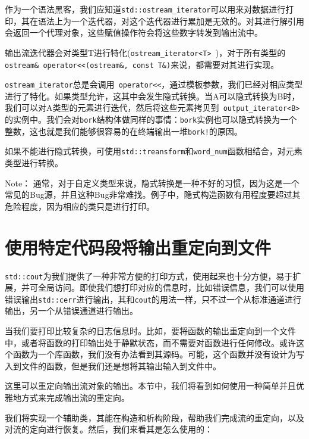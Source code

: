 
作为一个语法黑客，我们应知道\texttt{std::ostream\_iterator}可以用来对数据进行打印，其在语法上为一个迭代器，对这个迭代器进行累加是无效的。对其进行解引用会返回一个代理对象，这些赋值操作符会将这些数字转发到输出流中。

输出流迭代器会对类型T进行特化(\texttt{ostream\_iterator<T> })，对于所有类型的\texttt{ ostream\& operator<<(ostream\&, const T\&)}来说，都需要对其进行实现。

\texttt{ostream\_iterator}总是会调用\texttt{ operator<<}，通过模板参数，我们已经对相应类型进行了特化。如果类型允许，这其中会发生隐式转换。当A可以隐式转换为B时，我们可以对A类型的元素进行迭代，然后将这些元素拷贝到\texttt{ output\_iterator<B>}的实例中。我们会对\texttt{bork}结构体做同样的事情：\texttt{bork}实例也可以隐式转换为一个整数，这也就是我们能够很容易的在终端输出一堆\texttt{bork!}的原因。

如果不能进行隐式转换，可使用\texttt{std::treansform}和\texttt{word\_num}函数相结合，对元素类型进行转换。

\begin{myInfoBox}
Note： 通常，对于自定义类型来说，隐式转换是一种不好的习惯，因为这是一个常见的Bug源，并且这种Bug非常难找。例子中，隐式构造函数有用程度要超过其危险程度，因为相应的类只是进行打印。
\end{myInfoBox}


\section{使用特定代码段将输出重定向到文件}

\texttt{std::cout}为我们提供了一种非常方便的打印方式，使用起来也十分方便，易于扩展，并可全局访问。即使我们想打印对应的信息时，比如错误信息，我们可以使用错误输出\texttt{std::cerr}进行输出，其和\texttt{cout}的用法一样，只不过一个从标准通道进行输出，另一个从错误通道进行输出。

当我们要打印比较复杂的日志信息时。比如，要将函数的输出重定向到一个文件中，或者将函数的打印输出处于静默状态，而不需要对函数进行任何修改。或许这个函数为一个库函数，我们没有办法看到其源码。可能，这个函数并没有设计为写入到文件的函数，但是我们还是想将其输出输入到文件中。

这里可以重定向输出流对象的输出。本节中，我们将看到如何使用一种简单并且优雅地方式来完成输出流的重定向。


我们将实现一个辅助类，其能在构造和析构阶段，帮助我们完成流的重定向，以及对流的定向进行恢复。然后，我们来看其是怎么使用的：

